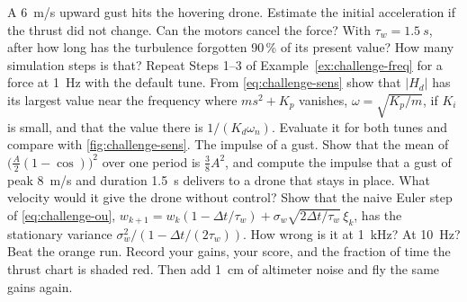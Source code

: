 \begin{exercises}
\exercise[1] A \SI{6}{m/s} upward gust hits the hovering drone. Estimate the initial acceleration if the thrust did not change. Can the motors cancel the force?
\exercise[1] With $\tau_w = \SI{1.5}{s}$, after how long has the turbulence forgotten 90\,\% of its present value? How many simulation steps is that?
\exercise[1] Repeat Steps 1–3 of Example~\ref{ex:challenge-freq} for a force at \SI{1}{Hz} with the default tune.
\exercise[2] From \cref{eq:challenge-sens} show that $|H_d|$ has its largest value near the frequency where $ms^2 + K_p$ vanishes, $\omega = \sqrt{K_p/m}$, if $K_i$ is small, and that the value there is $1/(K_d\omega_n)$. Evaluate it for both tunes and compare with \cref{fig:challenge-sens}.
\exercise[2] The impulse of a gust. Show that the mean of $\big(\tfrac{A}{2}(1 - \cos)\big)^2$ over one period is $\tfrac38A^2$, and compute the impulse that a gust of peak \SI{8}{m/s} and duration \SI{1.5}{s} delivers to a drone that stays in place. What velocity would it give the drone without control?
\exercise[2] Show that the naive Euler step of \cref{eq:challenge-ou}, $w_{k+1} = w_k(1 - \Delta t/\tau_w) + \sigma_w\sqrt{2\Delta t/\tau_w}\,\xi_k$, has the stationary variance $\sigma_w^2/(1 - \Delta t/(2\tau_w))$. How wrong is it at \SI{1}{kHz}? At \SI{10}{Hz}?
\exercise[2] Beat the orange run. Record your gains, your score, and the fraction of time the thrust chart is shaded red. Then add \SI{1}{cm} of altimeter noise and fly the same gains again.

\end{exercises}
